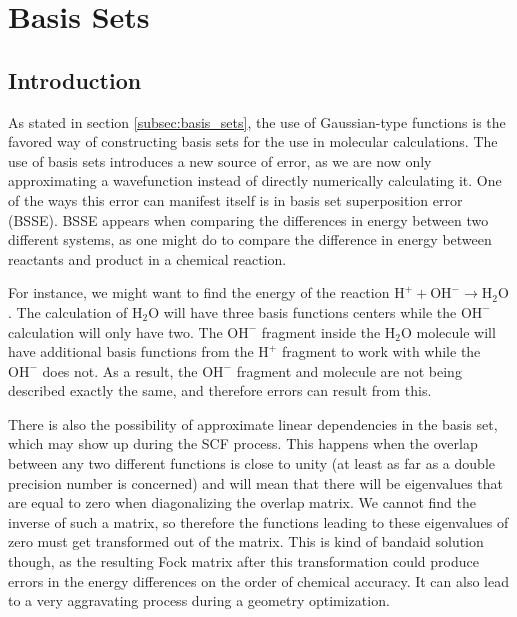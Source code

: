 \chapter{Basis Sets}
\label{chap:basis_sets}
\section{Introduction}
As stated in section \ref{subsec:basis_sets}, the use of Gaussian-type functions is the favored way of constructing basis sets for the use in molecular calculations. The use of basis sets introduces a new source of error, as we are now only approximating a wavefunction instead of directly numerically calculating it. One of the ways this error can manifest itself is in basis set superposition error (BSSE). BSSE appears when comparing the differences in energy between two different systems, as one might do to compare the difference in energy between reactants and product in a chemical reaction. 

For instance, we might want to find the energy of the reaction $\text{H}^{+} + \text{OH}^{-} \rightarrow \text{H}_{2}\text{O}$. The calculation of $\text{H}_{2}\text{O}$ will have three basis functions centers while the $\text{OH}^{-}$ calculation will only have two. The $\text{OH}^{-}$ fragment inside the $\text{H}_{2}\text{O}$ molecule will have additional basis functions from the $\text{H}^{+}$ fragment to work with while the $\text{OH}^{-}$ does not. As a result, the $\text{OH}^{-}$ fragment and molecule are not being described exactly the same, and therefore errors can result from this.


There is also the possibility of approximate linear dependencies in the basis set, which may show up during the SCF process. This happens when the overlap between any two different functions is close to unity (at least as far as a double precision number is concerned) and will mean that there will be eigenvalues that are equal to zero when diagonalizing the overlap matrix. We cannot find the inverse of such a matrix, so therefore the functions leading to these eigenvalues of zero must get transformed out of the matrix. This is kind of bandaid solution though, as the resulting Fock matrix after this transformation could produce errors in the energy differences on the order of chemical accuracy. It can also lead to a very aggravating process during a geometry optimization. 

